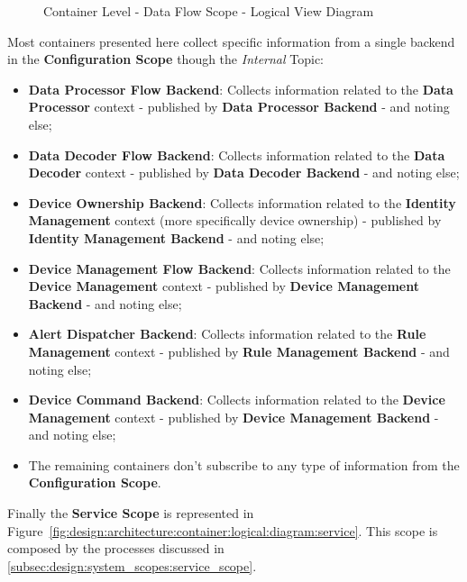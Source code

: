 \begin{figure}[H]
   \centering
   \resizebox{\columnwidth}{!}
   {      
      
   }
   \caption[Container Level - Data Flow Scope - Logical View Diagram]{Container Level - Data Flow Scope - Logical View Diagram}
   \label{fig:design:architecture:container:logical:diagram:data_flow}
\end{figure}

Most containers presented here collect specific information from a single backend in the \textbf{Configuration Scope} though the \textit{Internal} Topic:

\begin{itemize}
   \item \textbf{Data Processor Flow Backend}: Collects information related to the \textbf{Data Processor} context - published by \textbf{Data Processor Backend} - and noting else;
   \item \textbf{Data Decoder Flow Backend}: Collects information related to the \textbf{Data Decoder} context - published by \textbf{Data Decoder Backend} - and noting else;
   \item \textbf{Device Ownership Backend}: Collects information related to the \textbf{Identity Management} context (more specifically device ownership) - published by \textbf{Identity Management Backend} - and noting else;
   \item \textbf{Device Management Flow Backend}: Collects information related to the \textbf{Device Management} context - published by \textbf{Device Management Backend} - and noting else;
   \item \textbf{Alert Dispatcher Backend}: Collects information related to the \textbf{Rule Management} context - published by \textbf{Rule Management Backend} - and noting else;
   \item \textbf{Device Command Backend}: Collects information related to the \textbf{Device Management} context - published by \textbf{Device Management Backend} - and noting else;
   \item The remaining containers don't subscribe to any type of information from the \textbf{Configuration Scope}.
\end{itemize}

Finally the \textbf{Service Scope} is represented in Figure~\ref{fig:design:architecture:container:logical:diagram:service}. This scope is composed by the processes discussed in \ref{subsec:design:system_scopes:service_scope}.


